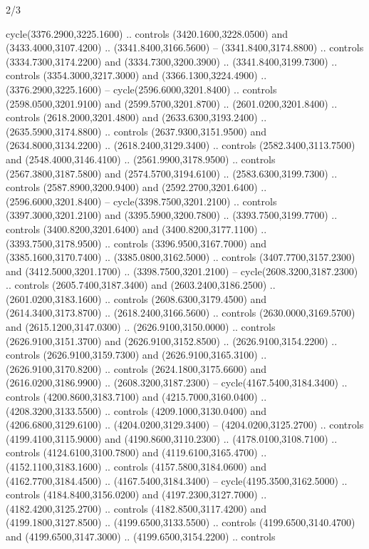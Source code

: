 \begin{flagdescription}{2/3}
\begin{scope}[shift={(0.5\flaglength,0.5)},scale=\flagwidth/130]
\begin{scope}[y=0.01mm, x=0.01mm,shift={(-3365,-2250)}]
  cycle(3376.2900,3225.1600) .. controls (3420.1600,3228.0500) and
  (3433.4000,3107.4200) .. (3341.8400,3166.5600) -- (3341.8400,3174.8800) ..
  controls (3334.7300,3174.2200) and (3334.7300,3200.3900) ..
  (3341.8400,3199.7300) .. controls (3354.3000,3217.3000) and
  (3366.1300,3224.4900) .. (3376.2900,3225.1600) -- cycle(2596.6000,3201.8400)
  .. controls (2598.0500,3201.9100) and (2599.5700,3201.8700) ..
  (2601.0200,3201.8400) .. controls (2618.2000,3201.4800) and
  (2633.6300,3193.2400) .. (2635.5900,3174.8800) .. controls
  (2637.9300,3151.9500) and (2634.8000,3134.2200) .. (2618.2400,3129.3400) ..
  controls (2582.3400,3113.7500) and (2548.4000,3146.4100) ..
  (2561.9900,3178.9500) .. controls (2567.3800,3187.5800) and
  (2574.5700,3194.6100) .. (2583.6300,3199.7300) .. controls
  (2587.8900,3200.9400) and (2592.2700,3201.6400) .. (2596.6000,3201.8400) --
  cycle(3398.7500,3201.2100) .. controls (3397.3000,3201.2100) and
  (3395.5900,3200.7800) .. (3393.7500,3199.7700) .. controls
  (3400.8200,3201.6400) and (3400.8200,3177.1100) .. (3393.7500,3178.9500) ..
  controls (3396.9500,3167.7000) and (3385.1600,3170.7400) ..
  (3385.0800,3162.5000) .. controls (3407.7700,3157.2300) and
  (3412.5000,3201.1700) .. (3398.7500,3201.2100) -- cycle(2608.3200,3187.2300)
  .. controls (2605.7400,3187.3400) and (2603.2400,3186.2500) ..
  (2601.0200,3183.1600) .. controls (2608.6300,3179.4500) and
  (2614.3400,3173.8700) .. (2618.2400,3166.5600) .. controls
  (2630.0000,3169.5700) and (2615.1200,3147.0300) .. (2626.9100,3150.0000) ..
  controls (2626.9100,3151.3700) and (2626.9100,3152.8500) ..
  (2626.9100,3154.2200) .. controls (2626.9100,3159.7300) and
  (2626.9100,3165.3100) .. (2626.9100,3170.8200) .. controls
  (2624.1800,3175.6600) and (2616.0200,3186.9900) .. (2608.3200,3187.2300) --
  cycle(4167.5400,3184.3400) .. controls (4200.8600,3183.7100) and
  (4215.7000,3160.0400) .. (4208.3200,3133.5500) .. controls
  (4209.1000,3130.0400) and (4206.6800,3129.6100) .. (4204.0200,3129.3400) --
  (4204.0200,3125.2700) .. controls (4199.4100,3115.9000) and
  (4190.8600,3110.2300) .. (4178.0100,3108.7100) .. controls
  (4124.6100,3100.7800) and (4119.6100,3165.4700) .. (4152.1100,3183.1600) ..
  controls (4157.5800,3184.0600) and (4162.7700,3184.4500) ..
  (4167.5400,3184.3400) -- cycle(4195.3500,3162.5000) .. controls
  (4184.8400,3156.0200) and (4197.2300,3127.7000) .. (4182.4200,3125.2700) ..
  controls (4182.8500,3117.4200) and (4199.1800,3127.8500) ..
  (4199.6500,3133.5500) .. controls (4199.6500,3140.4700) and
  (4199.6500,3147.3000) .. (4199.6500,3154.2200) .. controls

\end{scope}
\end{scope}
\end{flagdescription}
